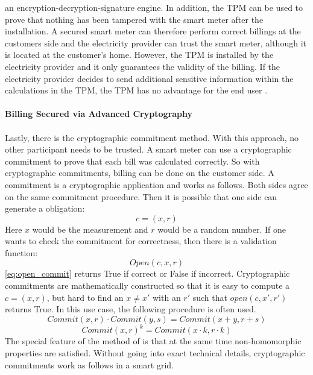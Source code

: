 an encryption-decryption-signature engine. In addition, the \gls{TPM} can be used to prove that nothing has been tampered with the smart meter after the installation. A secured smart meter can therefore perform correct billings at the customers side and the electricity provider can trust the smart meter, although it is located at the customer's home. However, the \gls{TPM} is installed by the electricity provider and it only guarantees the validity of the billing. If the electricity provider decides to send additional sensitive information within the calculations in the \gls{TPM}, the \gls{TPM} has no advantage for the end user \cite{finster2014privacy}.\\
\\
\textbf{Billing Secured via Advanced Cryptography}
\\
\\
Lastly, there is the cryptographic commitment method.
With this approach, no other participant needs to be trusted. A smart meter can use a cryptographic commitment to prove that each bill was calculated correctly. So with cryptographic commitments, billing can be done on the customer side. A commitment is a cryptographic application and works as follows. Both sides agree on the same commitment procedure. Then it is possible that one side can generate a obligation:\begin{equation}
\label{eq:commitment}
c=(x,r)
\end{equation} 
Here $x$ would be the measurement and $r$ would be a random number. If one wants to check the commitment for correctness, then there is a validation function:
\begin{equation}
\label{eq:open_commit}
Open(c,x,r)
\end{equation} 
\ref{eq:open_commit} returns True if correct or False if incorrect.
Cryptographic commitments are mathematically constructed so that it is easy to compute a $c=(x,r)$, but hard to find an $x \neq x'$ with an $r'$ such that $open(c,x',r')$ returns True. In this use case, the following procedure is often used.\\
\begin{equation}
\label{eq:homomorph1}
Commit(x, r) \cdot Commit(y, s) = Commit(x+y, r+s)
\end{equation} 
\begin{equation}
\label{eq:homomorph2}
Commit(x, r)^{k} = Commit(x \cdot k, r \cdot k)
\end{equation} 
The special feature of the method of \cite{pedersen1991non} is that at the same time non-homomorphic properties are satisfied. Without going into exact technical details, cryptographic commitments work as follows in a smart grid.\\

